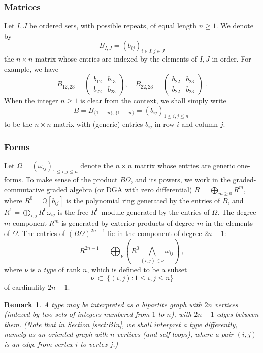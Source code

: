 \documentclass[10pt]{amsart}
\newcommand{\QQ}{{\mathbb Q}}
\theoremstyle{plain}
\newtheorem{remark}[thm]{Remark}
\newcommand{\0}{\color{blue}{\mathsf{0}}}
\begin{document}
\subsubsection{Matrices}  \label{subsubsectMatrices}
Let $I, J$ be ordered sets, with possible repeats, of equal length $n\geq 1$. We denote by 
\[ B_{I,J} = (b_{ij})_{i\in I, j\in J}\]
the $n\times n$ matrix whose entries are indexed by  the elements of $I,J$ in order. 
For example, we have
$$
B_{12,23}=\left(\begin{array}{cc}b_{12}&b_{13}\\b_{22}&b_{23}\end{array}\right),\quad B_{22,23}=\left(\begin{array}{cc}b_{22}&b_{23}\\b_{22}&b_{23}\end{array}\right) \ . 
$$
When the integer $n\geq 1$ is clear from the context, we shall simply write
\[ B = B_{\{1,\ldots, n\}, \{1,\ldots, n \}} = (b_{ij})_{1\leq i,j\leq n}\ \]
to be the $n\times n$ matrix with (generic) entries $b_{ij}$ in row $i$ and column $j$.

\subsubsection{Forms} \label{sect:Forms} Let $\Omega= (\omega_{ij})_{1\leq i, j \leq n}$ denote the $n\times n$ matrix whose entries are generic one-forms. 
To make sense of the product $B\Omega$, and its powers, we work in the graded-commutative  graded algebra (or DGA with zero differential) $R= \bigoplus_{m\geq 0} R^m$,  
where  $R^0 = \QQ[b_{ij}]$ is the polynomial ring generated by the entries of $B$, and $R^1= \bigoplus_{i,j} R^0 \omega_{ij} $ 
is the free $R^0$-module generated by the entries of $\Omega.$ The degree $m$ component $R^m$ is generated by exterior products of degree $m$ in the elements of $\Omega$.  The entries of $(B\Omega)^{2n-1}$ lie in the component of degree $2n-1$:
\[ R^{2n-1}  =  \bigoplus_{\nu}  \left(  R^0  \!  \bigwedge_{(i,j) \in \nu } \omega_{ij} \right)\ ,\]
where $\nu$ is a \emph{type} of rank $n$,  which is defined to be a subset 
\begin{equation}  \label{defn: nu} \nu  \ \subset \  \{ (i,j): 1\leq i, j\leq n\} \end{equation}
 of cardinality $2n-1$. 
 \begin{remark} \label{rem:typeisgraph}
 A type   may be interpreted as a bipartite graph   with $2n$ vertices (indexed by two sets of integers numbered  from $1$ to $n$), with  $2n-1$ edges between them.
(Note that in Section \ref{sect:BIn}, we shall interpret a type differently, namely as an oriented graph with $n$ vertices (and self-loops),
 where a pair $(i,j)$ is an edge from vertex $i$ to vertex $j$.)
 \end{remark}
\end{document}

